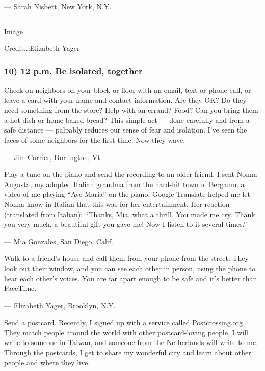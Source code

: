 --- Sarah Nisbett, New York, N.Y.

\begin{center}\rule{0.5\linewidth}{\linethickness}\end{center}

Image

Credit...Elizabeth Yager

\hypertarget{10-12-pm-be-isolated-together}{%
\subsubsection{\texorpdfstring{\textbf{10) 12 p.m. Be isolated,
together}}{10) 12 p.m. Be isolated, together}}\label{10-12-pm-be-isolated-together}}

Check on neighbors on your block or floor with an email, text or phone
call, or leave a card with your name and contact information. Are they
OK? Do they need something from the store? Help with an errand? Food?
Can you bring them a hot dish or home-baked bread? This simple act ---
done carefully and from a safe distance --- palpably reduces our sense
of fear and isolation. I've seen the faces of some neighbors for the
first time. Now they wave.

--- Jim Carrier, Burlington, Vt.

Play a tune on the piano and send the recording to an older friend. I
sent Nonna Augusta, my adopted Italian grandma from the hard-hit town of
Bergamo, a video of me playing ``Ave Maria'' on the piano. Google
Translate helped me let Nonna know in Italian that this was for her
entertainment. Her reaction (translated from Italian): ``Thanks, Mia,
what a thrill. You made me cry. Thank you very much, a beautiful gift
you gave me! Now I listen to it several times.''

--- Mia Gonzales, San Diego, Calif.

Walk to a friend's house and call them from your phone from the street.
They look out their window, and you can see each other in person, using
the phone to hear each other's voices. You are far apart enough to be
safe and it's better than FaceTime.

--- Elizabeth Yager, Brooklyn, N.Y.

Send a postcard. Recently, I signed up with a service called
\href{https://www.postcrossing.com/}{Postcrossing.org}. They match
people around the world with other postcard-loving people. I will write
to someone in Taiwan, and someone from the Netherlands will write to me.
Through the postcards, I get to share my wonderful city and learn about
other people and where they live.

